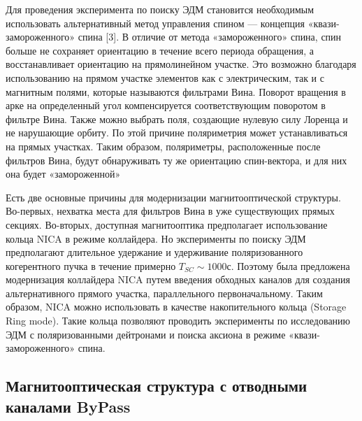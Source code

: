 \par Для проведения эксперимента по поиску ЭДМ становится необходимым использовать альтернативный метод управления спином — концепция «квази-замороженного» спина [3]. В отличие от метода «замороженного» спина, спин больше не сохраняет ориентацию в течение всего периода обращения, а восстанавливает ориентацию на прямолинейном участке. Это возможно благодаря использованию на прямом участке элементов как с электрическим, так и с магнитным полями, которые называются фильтрами Вина. Поворот вращения в арке на определенный угол компенсируется соответствующим поворотом в фильтре Вина. Также можно выбрать поля, создающие нулевую силу Лоренца и не нарушающие орбиту. По этой причине поляриметрия может устанавливаться на прямых участках. Таким образом, поляриметры, расположенные после фильтров Вина, будут обнаруживать ту же ориентацию спин-вектора, и для них она будет «замороженной»

\par Есть две основные причины для модернизации магнитооптической структуры. Во-первых, нехватка места для фильтров Вина в уже существующих прямых секциях. Во-вторых, доступная магнитооптика предполагает использование кольца NICA в режиме коллайдера. Но эксперименты по поиску ЭДМ предполагают длительное удержание и удерживание поляризованного когерентного пучка в течение примерно $T_{SC} \sim 1000 с$. Поэтому была предложена модернизация коллайдера NICA путем введения обходных каналов для создания альтернативного прямого участка, параллельного первоначальному. Таким образом, NICA можно использовать в качестве накопительного кольца (Storage Ring mode). Такие кольца позволяют проводить эксперименты по исследованию ЭДМ с поляризованными дейтронами и поиска аксиона в режиме «квази-замороженного» спина.

\subsection{Магнитооптическая структура с отводными каналами ByPass}\label{sec:EDM/Wien_filter/ByPass}

